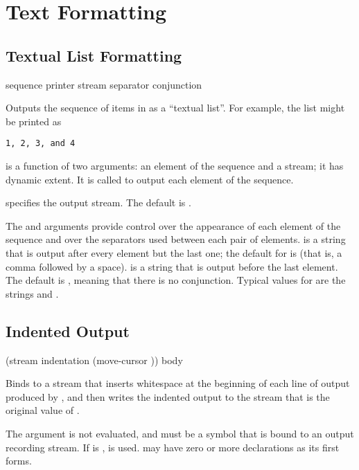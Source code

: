 
\chapter {Text Formatting}
\label {text-formatting}

\section {Textual List Formatting}

 {sequence printer
                              \key stream separator conjunction}

Outputs the sequence of items in  as a ``textual list''.  For
example, the list  might be printed as
\begin{verbatim}
1, 2, 3, and 4
\end{verbatim}

 is a function of two arguments: an element of the sequence and a
stream; it has dynamic extent.  It is called to output each element of the
sequence.

 specifies the output stream.  The default is .

The  and  arguments provide control over the
appearance of each element of the sequence and over the separators used between
each pair of elements.   is a string that is output after every
element but the last one; the default for  is  (that is,
a comma followed by a space).   is a string that is output
before the last element.  The default is , meaning that there is no
conjunction.  Typical values for  are the strings 
and .


\section {Indented Output}

 {(stream indentation \key (move-cursor ))
                              \body body}

Binds  to a stream that inserts whitespace at the beginning of each
line of output produced by , and then writes the indented output to
the stream that is the original value of .

The  argument is not evaluated, and must be a symbol that is bound to
an output recording stream.  If  is ,  is
used.   may have zero or more declarations as its first forms.

